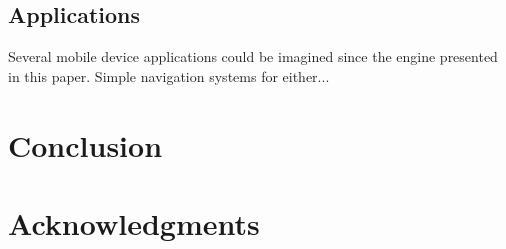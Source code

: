 \documentclass[journal]{IEEEtran}
\begin{document}
\subsection{Applications}
Several mobile device applications could be imagined since the engine presented in this paper. Simple navigation systems for either...\\
%
%







\section{Conclusion}
%




\section*{Acknowledgments}
\end{document}
